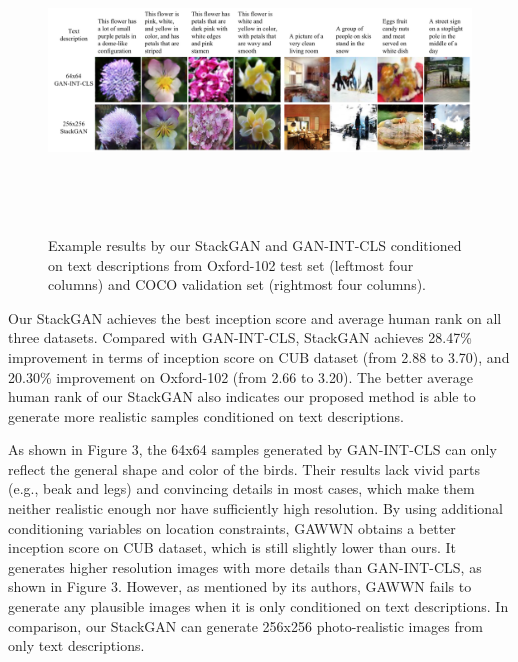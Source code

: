 \documentclass[a4paper,12pt,oneside]{article}
\begin{document}
\begin{figure}[H]
\centering
\includegraphics[height=8cm,width=15cm]{Figure4.png}
\caption[Example results by our StackGAN and GAN-INT-CLS conditioned on text descriptions from Oxford-102 test set and COCO validation set]{Example results by our StackGAN and GAN-INT-CLS conditioned on text descriptions from Oxford-102 test set (leftmost
four columns) and COCO validation set (rightmost four columns).}
\end{figure}

Our StackGAN achieves the best inception score and average human rank on all three datasets. Compared with GAN-INT-CLS, StackGAN achieves 28.47\% improvement in terms of inception score on CUB dataset (from 2.88 to 3.70), and 20.30\% improvement on Oxford-102 (from 2.66 to 3.20). The better average human rank of our StackGAN also indicates our proposed method is able to generate more realistic samples conditioned on text descriptions. 

As shown in Figure 3, the 64x64 samples generated by GAN-INT-CLS can only reflect the general shape and color of the birds.
Their results lack vivid parts (e.g., beak and legs) and convincing details in most cases, which make them neither realistic enough nor have sufficiently 
high resolution. By using additional conditioning variables on location constraints, GAWWN obtains a better inception score on CUB dataset, which is still slightly lower 
than ours. It generates higher resolution images with more details than GAN-INT-CLS, as shown in Figure 3. However, as mentioned by its authors, GAWWN fails to generate any plausible images when it is only conditioned 
on text descriptions. In comparison, our StackGAN can generate 256x256 photo-realistic images from only text descriptions. 
\end{document}
